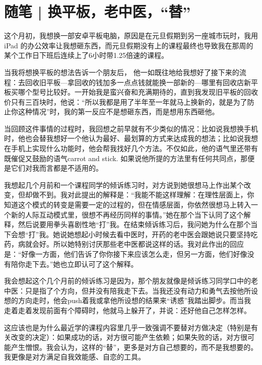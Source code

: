 \chapter{随笔 | 换平板，老中医，“替”}


这个月初，我想换一部安卓平板电脑，原因是在元旦假期到另一座城市玩时，我用 iPad 的办公效率让我想砸东西，而元旦假期没有上的课程最终也导致我在那周的某个工作日下班后连续上了6小时带1.25倍速的课程。

当我将想换平板的想法告诉一个朋友后， 他一如既往地给我想好了接下来的流程：去回收旧平板—拿回收的钱加多一点点钱就能换一部新的—哪里有回收店\pozhehao{}新平板买哪个型号比较好。一开始我是蛮兴奋和充满期待的，直到我发现旧平板的回收价只有三百块时，他说：“所以我都是用了半年至一年就马上换新的，就是为了防止你这种情况”时，我的第一反应不是想砸东西，而是想用东西砸他。

当回顾这件事情的过程时，我回想之前早就有不少类似的情况：比如说我想换手机时，他也会替我想好一个他认为最好、最划算的方式来达成我的想法；比如说我想在手机上实现什么功能时，他会帮我找好几个方法。不仅如此，他的语气里还带有既催促又鼓励的语气\pozhehao{}carrot and stick. 如果说他所提的方法里有任何共同点，那便是\pozhehao{}它们对我而言都是不适用的。

我想起几个月前和一个课程同学的倾诉练习时，对方说到她很想马上作出某个改变，但却做不到。我对此提出的解释是：“我能不能这样理解：在理性层面上，你知道这个模式的转变是需要一定的过程的，但在情感层面，你依然很想马上转入一个新的人际互动模式里，很想不再经历同样的事情。”她在那个当下认同了这个解释，然后说要用拳头喜剧性地“打”我。在结束倾诉练习后，我问她为什么在那个当下会想“打”我。她说她想起小时候去看中医时，开药的老中医会跟她说只要坚持吃药，病就会好。所以她特别讨厌那些老中医都说这样的话。我对此作出的回应是：“好像一方面，他们告诉了你你接下来应该怎么走，但另一方面，他们好像没有陪你走下去。”她也立即认可了这个解释。

我会想起这个几个月前的倾诉练习是因为，那个朋友就像是倾诉练习同学口中的老中医：只是指了个方向，但并没有陪我走下去。当我还没有动力和勇气去按他所设想的方向走时，他会push着我或拿他所设想的结果来“诱惑”我踏出脚步。而当我走着走着发现前面有个障碍时，他就马上躲开了，并说：还好他自己怎样怎样。

这应该也是为什么最近学的课程内容里几乎一致强调不要替对方做决定（特别是有关改变的决定）：如果成功的话，对方很可能产生依赖；如果失败的话，对方很可能产生憎恨。我会认为，这样的“替”，更多是对方自己想要的，而不是我想要的。我更像是对方满足自我效能感、自恋的工具。


